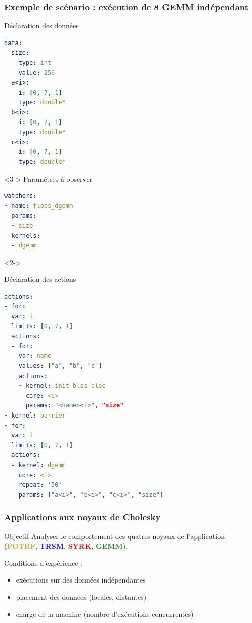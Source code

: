 \documentclass[xcolor={usenames,dvipsnames,svgnames,table}, aspectratio=43]{beamer}
\renewcommand{\emph}[1]{{\usebeamercolor[fg]{titlelike}#1}}
\newcommand{\potrfcolor}[1]{\textcolor{Goldenrod}{\textbf{#1}}\xspace}
\newcommand{\potrf}{\potrfcolor{POTRF}}
\newcommand{\trsmcolor}[1]{\textcolor{blue}{\textbf{#1}}\xspace}
\newcommand{\trsm}{\trsmcolor{TRSM}}
\newcommand{\syrkcolor}[1]{\textcolor{red}{\textbf{#1}}\xspace}
\newcommand{\syrk}{\syrkcolor{SYRK}}
\newcommand{\gemmcolor}[1]{\textcolor{ForestGreen}{\textbf{#1}}\xspace}
\newcommand{\gemm}{\gemmcolor{GEMM}}
\begin{document}
\begin{frame}[fragile]
\frametitle{Exemple de scénario : exécution de 8 GEMM indépendant}

\hspace{0.1cm}
\begin{minipage}[t]{0.38\linewidth}
  Déclaration des données
  \begin{lstlisting}[language=yaml]
data:
  size:
    type: int
    value: 256
  a<i>:
    i: [0, 7, 1]
    type: double*
  b<i>:
    i: [0, 7, 1]
    type: double*
  c<i>:
    i: [0, 7, 1]
    type: double*
  \end{lstlisting}
\begin{uncoverenv}<3->
  Paramètres à observer
  \begin{lstlisting}[language=yaml]
watchers:
- name: flops_dgemm
  params:
  - size
  kernels:
  - dgemm
  \end{lstlisting}
\end{uncoverenv}
\end{minipage}
\hspace{0.3cm}
\begin{uncoverenv}<2->
\begin{minipage}[t]{0.54\linewidth}
  Déclaration des actions
  \begin{lstlisting}[language=yaml]
actions:
- for:
  var: i
  limits: [0, 7, 1]
  actions:
  - for:
    var: name
    values: ["a", "b", "c"]
    actions:
    - kernel: init_blas_bloc
      core: <i>
      params: "<name><i>", "size"
- kernel: barrier
- for:
  var: i
  limits: [0, 7, 1]
  actions:
  - kernel: dgemm
    core: <i>
    repeat: '50'
    params: ["a<i>", "b<i>", "c<i>", "size"]
  \end{lstlisting}
\end{minipage}
\end{uncoverenv}

\end{frame}

\begin{frame}
\frametitle{Applications aux noyaux de Cholesky}

\begin{block}{Objectif}
  Analyser le comportement des quatres noyaux de l'application (\potrf, \trsm, \syrk, \gemm).

  Conditions d'expérience :
  \begin{itemize}
    \item exécutions sur des données \emph{indépendantes}
    \item placement des données (locales, distantes)
    \item charge de la machine (nombre d'exécutions concurrentes)
  \end{itemize}
\end{block}

\end{frame}
\end{document}
